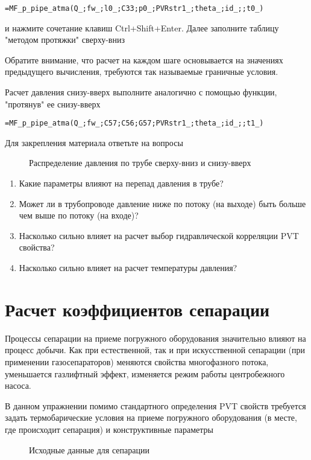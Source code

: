 { \small  \texttt{=MF\_p\_pipe\_atma(Q\_;fw\_;l0\_;C33;p0\_;PVRstr1\_;theta\_;id\_;;t0\_)
}}

и нажмите сочетание клавиш Ctrl+Shift+Enter. Далее заполните таблицу "методом протяжки" сверху-вниз

Обратите внимание, что расчет на каждом шаге основывается на значениях предыдущего вычисления, требуются так называемые граничные условия. 

Расчет давления снизу-вверх выполните аналогично с помощью функции, "протянув" ее снизу-вверх

{ \small  \texttt{=MF\_p\_pipe\_atma(Q\_;fw\_;C57;C56;G57;PVRstr1\_;theta\_;id\_;;t1\_)
}}

Для закрепления материала ответьте на вопросы

\begin{figure}[h!]
	\center{\texttt{[image: Ex50\_2]}}
	\caption{Распределение давления по трубе сверху-вниз и снизу-вверх}
	\label{ris:Ex50_2}
\end{figure}

\begin{enumerate}
	\item Какие параметры влияют на перепад давления в трубе?
	\item Может ли в трубопроводе давление ниже по потоку (на выходе) быть больше чем выше по потоку (на входе)?
	\item Насколько сильно влияет на расчет выбор гидравлической корреляции PVT свойства?
	\item Насколько сильно влияет на расчет температуры давления?
\end{enumerate}

\section{Расчет коэффициентов сепарации}

Процессы сепарации на приеме погружного оборудования значительно влияют на процесс добычи. Как при естественной, так и при искусственной сепарации (при применении газосепараторов) меняются свойства многофазного потока, уменьшается газлифтный эффект, изменяется режим работы центробежного насоса.

В данном упражнении помимо стандартного определения PVT свойств требуется задать термобарические условия на приеме погружного оборудования (в месте, где происходит сепарация) и конструктивные параметры


\begin{figure}[h!]
	\center{\texttt{[image: Ex60\_1]}}
	\caption{Исходные данные для сепарации}
	\label{ris:Ex60_1}
\end{figure}

